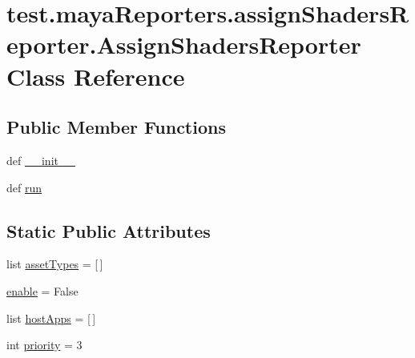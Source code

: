 \hypertarget{classtest_1_1mayaReporters_1_1assignShadersReporter_1_1AssignShadersReporter}{\section{test.\-maya\-Reporters.\-assign\-Shaders\-Reporter.\-Assign\-Shaders\-Reporter \-Class \-Reference}
\label{d7/d90/classtest_1_1mayaReporters_1_1assignShadersReporter_1_1AssignShadersReporter}
}
\subsection*{\-Public \-Member \-Functions}
\begin{DoxyCompactItemize}
\item 
def \hyperlink{classtest_1_1mayaReporters_1_1assignShadersReporter_1_1AssignShadersReporter_a89c97030c91f6abf312a1d06b9a3bc58}{\-\_\-\-\_\-init\-\_\-\-\_\-}
\item 
def \hyperlink{classtest_1_1mayaReporters_1_1assignShadersReporter_1_1AssignShadersReporter_ae5113acb4e666a04f2ca6e3454760308}{run}
\end{DoxyCompactItemize}
\subsection*{\-Static \-Public \-Attributes}
\begin{DoxyCompactItemize}
\item 
list \hyperlink{classtest_1_1mayaReporters_1_1assignShadersReporter_1_1AssignShadersReporter_acae69ef02aec749587be0c140d9ba800}{asset\-Types} = \mbox{[}$\,$\mbox{]}
\item 
\hyperlink{classtest_1_1mayaReporters_1_1assignShadersReporter_1_1AssignShadersReporter_a77e2d8863de9e2ac50fda274fb764c0c}{enable} = \-False
\item 
list \hyperlink{classtest_1_1mayaReporters_1_1assignShadersReporter_1_1AssignShadersReporter_aecc144d4f47947b1343eb966fe51c964}{host\-Apps} = \mbox{[}$\,$\mbox{]}
\item 
int \hyperlink{classtest_1_1mayaReporters_1_1assignShadersReporter_1_1AssignShadersReporter_a853cf847adf5f5839821099e22bf02f9}{priority} = 3
\end{DoxyCompactItemize}


